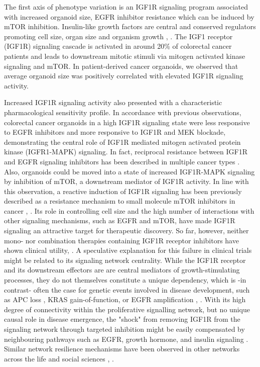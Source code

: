 \begin{flushleft}
The first axis of phenotype variation is an IGF1R signaling program associated with increased organoid size, EGFR inhibitor resistance which can be induced by mTOR inhibition. Insulin-like growth factors are central and conserved regulators promoting cell size, organ size and organism growth \cite{pucheHumanConditionsInsulinlike2012}, \cite{sunMechanismCellSize2006}. The IGF1 receptor (IGF1R) signaling cascade is activated in around 20\% of colorectal cancer patients and leads to downstream mitotic stimuli via mitogen activated kinase signaling and mTOR\cite{zhongOverproductionIGF2Drives2017}. In patient-derived cancer organoids, we observed that average organoid size was positively correlated with elevated IGF1R signaling activity.

Increased IGF1R signaling activity also presented with a characteristic pharmacological sensitivity profile. In accordance with previous observations\cite{yaoCombinedIGF1RMEK2016}, colorectal cancer organoids in a high IGF1R signaling state were less responsive to EGFR inhibitors and more responsive to IGF1R and MEK blockade, demonstrating the central role of IGF1R mediated mitogen activated protein kinase (IGFR1-MAPK) signaling. In fact, reciprocal resistance between IGF1R and EGFR signaling inhibitors has been described in multiple cancer types \cite{huaInsulinlikeGrowthFactor2020a}. Also, organoids could be moved into a state of increased IGF1R-MAPK signaling by inhibition of mTOR, a downstream mediator of IGF1R activity. In line with this observation, a reactive induction of IGF1R signaling has been previously described as a resistance mechanism to small molecule mTOR inhibitors in cancer \cite{sharmaChromatinmediatedReversibleDrugtolerant2010a}, \cite{yoonFocalAdhesionIGF1RDependent2017a}. Its role in controlling cell size and the high number of interactions with other signaling mechanisms, such as EGFR and mTOR, have made IGF1R signaling an attractive target for therapeutic discovery. So far, however, neither mono- nor combination therapies containing IGF1R receptor inhibitors have shown clinical utility\cite{beckwithMinireviewWereIGF2015}, \cite{CostsCausesOncologya}. A speculative explanation for this failure in clinical trials might be related to its signaling network centrality. While the IGF1R receptor and its downstream effectors are are central mediators of growth-stimulating processes, they do not themselves constitute a unique dependency, which is -in contrast- often the case for genetic events involved in disease development, such as APC loss \cite{Dow2015-pc}, KRAS gain-of-function, or EGFR amplification \cite{katoRevisitingEpidermalGrowth2019}, \cite{randonEGFRAmplificationMetastatic2021}. With its high degree of connectivity within the proliferative signalling network, but no unique causal role in disease emergence, the "shock" from removing IGF1R from the signaling network through targeted inhibition might be easily compensated by neighbouring pathways such as EGFR, growth hormone, and insulin signaling \cite{beckwithMinireviewWereIGF2015}. Similar network resilience mechanisms have been observed in other networks across the life and social sciences \cite{liuNetworkResilience2022a}, \cite{zotero-20481}.


\end{flushleft}
